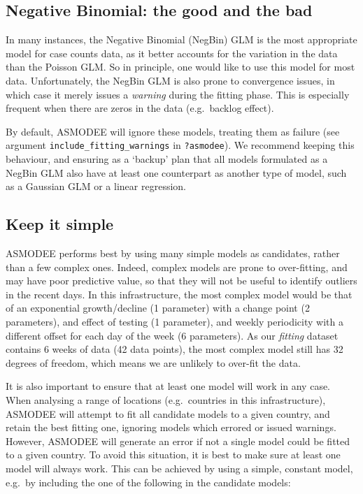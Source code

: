 \documentclass[]{book}
\begin{document}
\hypertarget{negative-binomial-the-good-and-the-bad}{%
\subsection{Negative Binomial: the good and the bad}\label{negative-binomial-the-good-and-the-bad}}

In many instances, the Negative Binomial (NegBin) GLM is the most appropriate
model for case counts data, as it better accounts for the variation in the data
than the Poisson GLM. So in principle, one would like to use this model for most
data. Unfortunately, the NegBin GLM is also prone to convergence issues, in
which case it merely issues a \emph{warning} during the fitting phase. This is
especially frequent when there are zeros in the data (e.g.~backlog effect).

By default, ASMODEE will ignore these models, treating them as failure (see
argument \texttt{include\_fitting\_warnings} in \texttt{?asmodee}). We recommend keeping this
behaviour, and ensuring as a `backup' plan that all models formulated as a
NegBin GLM also have at least one counterpart as another type of model, such as
a Gaussian GLM or a linear regression.

\hypertarget{keep-it-simple}{%
\subsection{Keep it simple}\label{keep-it-simple}}

ASMODEE performs best by using many simple models as candidates, rather than a
few complex ones. Indeed, complex models are prone to over-fitting, and may have
poor predictive value, so that they will not be useful to identify outliers in
the recent days. In this infrastructure, the most complex model would be that of
an exponential growth/decline (1 parameter) with a change point (2 parameters),
and effect of testing (1 parameter), and weekly periodicity with a different
offset for each day of the week (6 parameters). As our \emph{fitting} dataset
contains 6 weeks of data (42 data points), the most complex model still has 32
degrees of freedom, which means we are unlikely to over-fit the data.

It is also important to ensure that at least one model will work in any
case. When analysing a range of locations (e.g.~countries in this
infrastructure), ASMODEE will attempt to fit all candidate models to a given
country, and retain the best fitting one, ignoring models which errored or
issued warnings. However, ASMODEE will generate an error if not a single model
could be fitted to a given country. To avoid this situation, it is best to make
sure at least one model will always work. This can be achieved by using a
simple, constant model, e.g.~by including the one of the following in the
candidate models:
\end{document}
